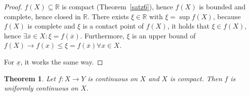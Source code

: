 \documentclass{article}
\newtheorem{theorem}{Theorem}  \numberwithin{theorem}{section}
\begin{document}
\begin{proof}
  $f(X) \subseteq \mathbb R$ is compact (Theorem~\ref{satz6}), hence $f(X)$ is bounded and complete, hence closed in $\mathbb R$.
  There exists $\xi \in \mathbb R$ with $\xi = \sup{f(X)}$, because $f(X)$ is complete and $\xi$ is a contact point of $f(X)$, it holds that $\xi \in f(X)$, hence $\exists \overline{x} \in X: \xi = f(\overline{x})$. Furthermore, $\xi$ is an upper bound of $f(X) \to f(x) \leq \xi = f(\overline{x}) \forall x \in X$.

  For $\underline{x}$, it works the same way.
\end{proof}

\begin{theorem} %
  \label{satz8}
  Let $f: X \to Y$ is continuous on $X$ and $X$ is compact. Then $f$ is uniformly continuous on $X$.
\end{theorem}
\end{document}
